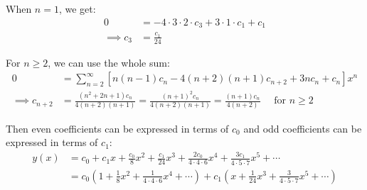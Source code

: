 {When $n = 1$, we get:
\begin{align*}
0 &= -4 \cdot 3 \cdot 2 \cdot c_3 + 3 \cdot 1 \cdot c_1  + c_1 \\
\implies c_3 &= \frac{c_1}{24}
\end{align*}

For $n \geq 2$, we can use the whole sum:
\begin{align*}
0 &= \sum_{n=2}^{\infty} [n (n-1) c_n - 4 (n+2)(n+1) c_{n+2} + 3 n c_n + c_n] x^n \\
\implies c_{n+2} &= \frac{(n^2 + 2n + 1) c_n}{4 (n+2)(n+1)} = \frac{(n+1)^2 c_n}{4 (n+2)(n+1)} = \frac{(n+1) c_n}{4 (n+2)} \quad \text{ for } n \geq 2
\end{align*}

Then even coefficients can be expressed in terms of $c_0$ and odd coefficients can be expressed in terms of $c_1$:
\begin{align*}
y(x) &= c_0 + c_1 x + \frac{c_0}{8} x^2 + \frac{c_1}{24} x^3 + \frac{2 c_0}{4 \cdot 4 \cdot 6} x^4 + \frac{3 c_1}{4 \cdot 5 \cdot 7} x^5 + \cdots \\
&= c_0 \left( 1 + \frac{1}{8} x^2 + \frac{1}{4 \cdot 4 \cdot 6} x^4 + \cdots \right) + c_1 \left( x + \frac{1}{24} x^3 + \frac{3}{4 \cdot 5 \cdot 7} x^5 + \cdots \right)
\end{align*}

}

